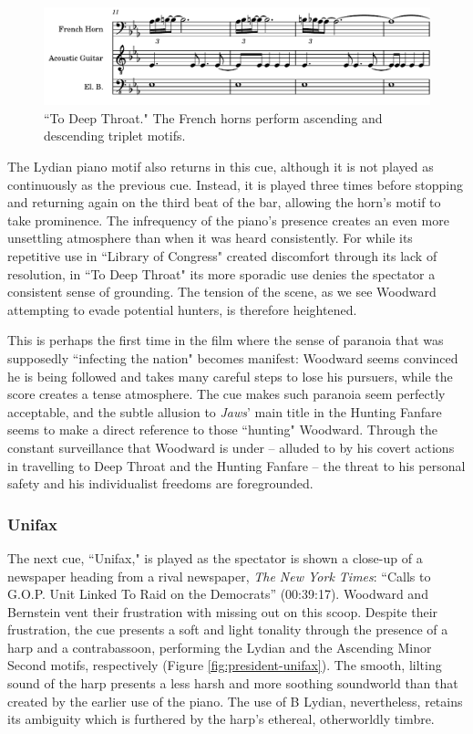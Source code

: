 \begin{figure}
    \centering
    \includegraphics[width=1\linewidth]{img/president-deep-fanfare.pdf}
    \caption{``To Deep Throat." The French horns perform ascending and descending triplet motifs.}
    \label{fig:president-deep-fanfare}
\end{figure}
The Lydian piano motif also returns in this cue, although it is not played as continuously as the previous cue.
Instead, it is played three times before stopping and returning again on the third beat of the bar, allowing the horn's motif to take prominence.
The infrequency of the piano's presence creates an even more unsettling atmosphere than when it was heard consistently.
For while its repetitive use in ``Library of Congress" created discomfort through its lack of resolution, in ``To Deep Throat" its more sporadic use denies the spectator a consistent sense of grounding.
The tension of the scene, as we see Woodward attempting to evade potential hunters, is therefore heightened.

This is perhaps the first time in the film where the sense of paranoia that was supposedly ``infecting the nation" becomes manifest:\autocites[][416]{perlstein_invisible_2014}
Woodward seems convinced he is being followed and takes many careful steps to lose his pursuers, while the score creates a tense atmosphere.
The cue makes such paranoia seem perfectly acceptable, and the subtle allusion to \textit{Jaws}' main title in the Hunting Fanfare seems to make a direct reference to those ``hunting" Woodward.
Through the constant surveillance that Woodward is under – alluded to by his covert actions in travelling to Deep Throat and the Hunting Fanfare – the threat to his personal safety and his individualist freedoms are foregrounded.


\subsubsection{Unifax}

The next cue, ``Unifax," is played as the spectator is shown a close-up of a newspaper heading from a rival newspaper, \textit{The New York Times}: ``Calls to G.O.P. Unit Linked To Raid on the Democrats” (00:39:17).
Woodward and Bernstein vent their frustration with missing out on this scoop. Despite their frustration, the cue presents a soft and light tonality through the presence of a harp and a contrabassoon, performing the Lydian and the Ascending Minor Second motifs, respectively (Figure \ref{fig:president-unifax}).
The smooth, lilting sound of the harp presents a less harsh and more soothing soundworld than that created by the earlier use of the piano.
The use of B Lydian, nevertheless, retains its ambiguity which is furthered by the harp’s ethereal, otherworldly timbre.

